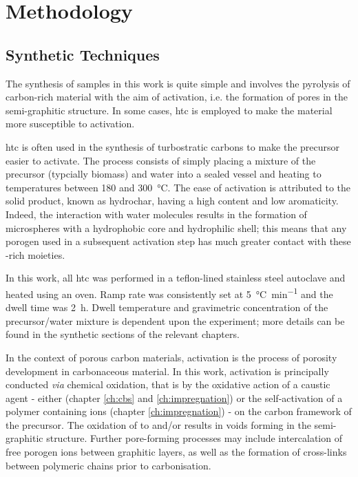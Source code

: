 \chapter{Methodology}
\label{ch:methodology}

\newpage
\section{Synthetic Techniques}
The synthesis of samples in this work is quite simple and involves the \gls{pyrolysis} of carbon-rich material with the aim of \gls{activation}, i.e. the formation of pores in the semi-graphitic structure. In some cases, \gls{htc} is employed to make the material more susceptible to \gls{activation}.

\Gls{htc} is often used in the synthesis of \glspl{turbostratic carbon} to make the precursor easier to activate. The process consists of simply placing a mixture of the precursor (typcially biomass) and water into a sealed vessel and heating to temperatures between 180 and \qty{300}{\degreeCelsius}. The ease of activation is attributed to the solid product, known as \gls{hydrochar}, having a high  content and low aromaticity.\citep{Sevilla2011Hydrothermal, Sevilla2009Chemical, Sevilla2009a} Indeed, the interaction with water molecules results in the formation of microspheres with a hydrophobic core and hydrophilic shell; this means that any \gls{porogen} used in a subsequent activation step has much greater contact with these -rich moieties. 

In this work, all \gls{htc} was performed in a teflon-lined stainless steel autoclave and heated using an oven. Ramp rate was consistently set at \qty{5}{\degreeCelsius\per\minute} and the dwell time was \qty{2}{\hour}. Dwell temperature and gravimetric concentration of the precursor/water mixture is dependent upon the experiment; more details can be found in the synthetic sections of the relevant chapters.

In the context of porous carbon materials, activation is the process of porosity development in carbonaceous material.\citep{Sevilla2014Energy} In this work, activation is principally conducted \textit{via} chemical oxidation,\citep{Sevilla2014Energy} that is by the oxidative action of a caustic agent - either  (chapter \ref{ch:cbs} and \ref{ch:impregnation}) or the self-activation of a polymer containing  ions (chapter \ref{ch:impregnation}) - on the carbon framework of the precursor. The oxidation of  to  and/or  results in voids forming in the semi-graphitic structure.\citep{Wang2009High, Wang2012, Otowa1993Production} Further pore-forming processes may include intercalation of free \gls{porogen} ions between graphitic layers,\citep{LozanoCastello2007Carbon} as well as the formation of cross-links between polymeric chains prior to carbonisation.\citep{lin2015preparation, yu2017koh, yu2017one}

